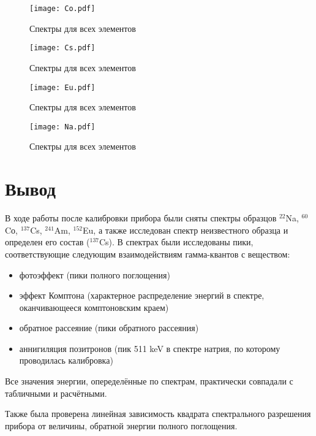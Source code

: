 	\begin{figure}
		\centering
		\texttt{[image: Co.pdf]}
		\caption{Спектры для всех элементов}
		\label{fig:Co}
	\end{figure}

	\begin{figure}
		\centering
		\texttt{[image: Cs.pdf]}
		\caption{Спектры для всех элементов}
		\label{fig:Cs}
	\end{figure}

	\begin{figure}
		\centering
		\texttt{[image: Eu.pdf]}
		\caption{Спектры для всех элементов}
		\label{fig:Eu}
	\end{figure}

	\begin{figure}
		\centering
		\texttt{[image: Na.pdf]}
		\caption{Спектры для всех элементов}
		\label{fig:Na}
	\end{figure}



	\section*{Вывод}

	В ходе работы после калибровки прибора были сняты спектры образцов $^{22}$Na,  $^{60}$Cо,  $^{137}$Cs, $^{241}$Am, $^{152}$Eu, а также исследован спектр неизвестного образца и определен его состав ($^{137}$Cs). В спектрах были исследованы пики, соответствующие следующим взаимодействиям гамма-квантов с веществом:
	\begin{itemize}
		\item фотоэффект (пики полного поглощения)
		\item эффект Комптона (характерное распределение энергий в спектре, оканчивающееся комптоновским краем)
		\item обратное рассеяние (пики обратного рассеяния)
		\item аннигиляция позитронов (пик 511 keV в спектре натрия, по которому проводилась калибровка)
	\end{itemize}

	Все значения энергии, опеределённые по спектрам, практически совпадали с табличными и расчётными. \par

	Также была проверена линейная зависимость квадрата спектрального разрешения прибора от величины, обратной энергии полного поглощения.


